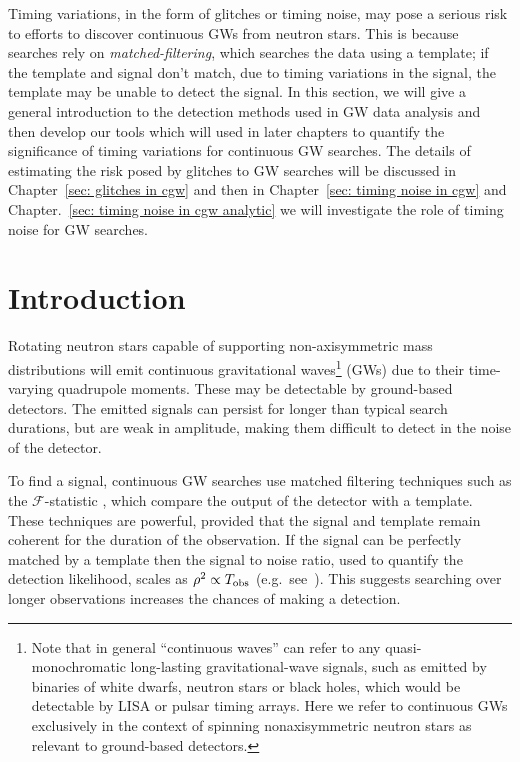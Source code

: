 \documentclass[../full_thesis/full_thesis.tex]{subfiles}
\begin{document}
Timing variations, in the form of glitches or timing noise, may pose a serious
risk to efforts to discover continuous GWs from neutron stars. This is because
searches rely on \emph{matched-filtering}, which searches the data using a
template; if the template and signal don't match, due to timing variations in
the signal, the template may be unable to detect the signal. In this section,
we will give a general introduction to the detection methods used in GW data
analysis and then develop our tools which will used in later chapters to
quantify the significance of timing variations for continuous GW searches. The
details of estimating the risk posed by glitches to GW searches will be
discussed in Chapter~\ref{sec: glitches in cgw} and then in Chapter~\ref{sec:
timing noise in cgw} and Chapter.~\ref{sec: timing noise in cgw analytic} we
will investigate the role of timing noise for GW searches.

\section{Introduction}
\label{sec: introduction cgw}
Rotating neutron stars capable of supporting non-axisymmetric mass
distributions will emit continuous gravitational
waves\footnote{Note that in general ``continuous waves'' can
    refer to any quasi-monochromatic long-lasting gravitational-wave
        signals, such as emitted by binaries of white dwarfs, neutron
        stars or black holes, which would be detectable by LISA or pulsar
        timing arrays. Here we refer to continuous GWs exclusively in the context of
        spinning nonaxisymmetric neutron stars as relevant to ground-based
        detectors.}
(GWs) due to their
time-varying quadrupole moments. These may be detectable by ground-based detectors. The emitted
signals can persist for longer than
typical search durations, but are weak in amplitude, making them difficult to detect
in the noise of the detector.

To find a signal, continuous GW searches use matched
filtering techniques such as the $\mathcal{F}$-statistic \citep{Jaranowski1998},
which compare the output of the detector with a template.  These techniques are
powerful, provided that the signal and template remain coherent for the duration
of the observation. If the signal can be perfectly matched by a template then
the signal to noise ratio, used to quantify the detection likelihood, scales as
$\rho^{2} \propto T_{\textrm{obs}}$ (e.g.\ see~\citep{Prix2009}). This suggests searching
over longer observations increases the chances of making a detection.
\end{document}
